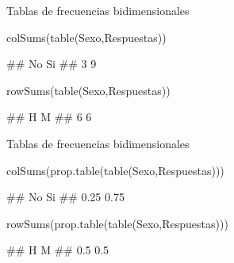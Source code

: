 \documentclass[
  ignorenonframetext,
  aspectratio=169]{beamer}
\newenvironment{Shaded}{\begin{snugshade}}{\end{snugshade}}
\newcommand{\FunctionTok}[1]{\textcolor[rgb]{0.00,0.00,0.00}{#1}}
\newcommand{\NormalTok}[1]{#1}
\let\oldverbatim\verbatim
\let\endoldverbatim\endverbatim
\renewenvironment{verbatim}{\tiny\oldverbatim}{\endoldverbatim}
\begin{document}
\begin{frame}[fragile]{Tablas de frecuencias bidimensionales}
\protect\hypertarget{tablas-de-frecuencias-bidimensionales-9}{}
\begin{Shaded}
\begin{Highlighting}[]
\FunctionTok{colSums}\NormalTok{(}\FunctionTok{table}\NormalTok{(Sexo,Respuestas)) }
\end{Highlighting}
\end{Shaded}

\begin{verbatim}
## No Si 
##  3  9
\end{verbatim}

\begin{Shaded}
\begin{Highlighting}[]
\FunctionTok{rowSums}\NormalTok{(}\FunctionTok{table}\NormalTok{(Sexo,Respuestas)) }
\end{Highlighting}
\end{Shaded}

\begin{verbatim}
## H M 
## 6 6
\end{verbatim}
\end{frame}

\begin{frame}[fragile]{Tablas de frecuencias bidimensionales}
\protect\hypertarget{tablas-de-frecuencias-bidimensionales-10}{}
\begin{Shaded}
\begin{Highlighting}[]
\FunctionTok{colSums}\NormalTok{(}\FunctionTok{prop.table}\NormalTok{(}\FunctionTok{table}\NormalTok{(Sexo,Respuestas)))}
\end{Highlighting}
\end{Shaded}

\begin{verbatim}
##   No   Si 
## 0.25 0.75
\end{verbatim}

\begin{Shaded}
\begin{Highlighting}[]
\FunctionTok{rowSums}\NormalTok{(}\FunctionTok{prop.table}\NormalTok{(}\FunctionTok{table}\NormalTok{(Sexo,Respuestas)))}
\end{Highlighting}
\end{Shaded}

\begin{verbatim}
##   H   M 
## 0.5 0.5
\end{verbatim}
\end{frame}
\end{document}
